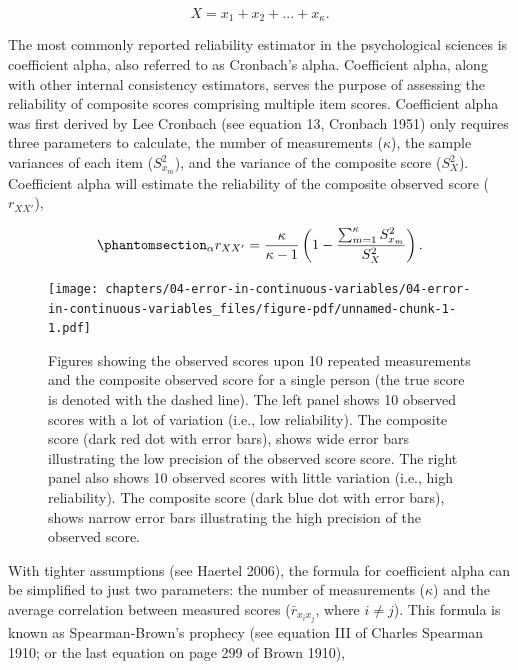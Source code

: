 \documentclass[
  letterpaper,
  DIV=11,
  numbers=noendperiod]{scrreprt}
\begin{document}
\[
X = x_1 + x_2 +...+x_\kappa.
\]

The most commonly reported reliability estimator in the psychological
sciences is coefficient alpha, also referred to as Cronbach's alpha.
Coefficient alpha, along with other internal consistency estimators,
serves the purpose of assessing the reliability of composite scores
comprising multiple item scores. Coefficient alpha was first derived by
Lee Cronbach (see equation 13, Cronbach 1951) only requires three
parameters to calculate, the number of measurements (\(\kappa\)), the
sample variances of each item (\(S^2_{x_m}\)), and the variance of the
composite score (\(S^2_{X}\)). Coefficient alpha will estimate the
reliability of the composite observed score (\(r_{XX'}\)),

\begin{equation}\phantomsection\label{eq-alpha}{
_\alpha r_{XX'} = \frac{\kappa}{\kappa-1}\left( 1 - \frac{\sum_{m=1}^\kappa S^2_{x_m}}{S^2_{X}} \right).
}\end{equation}

\begin{figure}[H]

{\centering \texttt{[image: chapters/04-error-in-continuous-variables/04-error-in-continuous-variables\_files/figure-pdf/unnamed-chunk-1-1.pdf]}

}

\caption{Figures showing the observed scores upon 10 repeated
measurements and the composite observed score for a single person (the
true score is denoted with the dashed line). The left panel shows 10
observed scores with a lot of variation (i.e., low reliability). The
composite score (dark red dot with error bars), shows wide error bars
illustrating the low precision of the observed score score. The right
panel also shows 10 observed scores with little variation (i.e., high
reliability). The composite score (dark blue dot with error bars), shows
narrow error bars illustrating the high precision of the observed
score.}

\end{figure}%

With tighter assumptions (see Haertel 2006), the formula for coefficient
alpha can be simplified to just two parameters: the number of
measurements (\(\kappa\)) and the average correlation between measured
scores (\(\bar{r}_{x_i x_j}\), where \(i\neq j\)). This formula is known
as Spearman-Brown's prophecy (see equation III of Charles Spearman 1910;
or the last equation on page 299 of Brown 1910),
\end{document}
